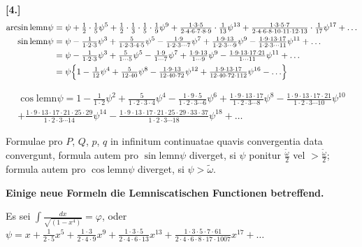 \documentclass[10pt,a4paper]{article}
\newcommand{\lemn}{\text{lemn}}
\newcommand{\sinlemn}{\sin\lemn}
\newcommand{\coslemn}{\cos\lemn}
\newcommand{\arcsinlemn}{\arcsin\lemn}
\begin{document}
\medskip
\noindent\textbf{[4.]}
\begin{align*}
\arcsinlemn\psi &= \psi + \tfrac12\cdot\tfrac15\psi^5 + \tfrac12\cdot\tfrac13\cdot\tfrac15\cdot\tfrac{1}{9}\psi^9 + \tfrac{1\cdot3\cdot5}{2\cdot4\cdot6\cdot7\cdot8\cdot9}\cdot\tfrac{1}{13}\psi^{13} + \tfrac{1\cdot3\cdot5\cdot7}{2\cdot4\cdot6\cdot8\cdot10\cdot11\cdot12\cdot13}\cdot\tfrac{1}{17}\psi^{17} + \ldots\\
\sinlemn\psi &= \psi - \tfrac{1}{1\cdot2\cdot3}\psi^3 + \tfrac{5}{1\cdot2\cdot3\cdot4\cdot5}\psi^5 - \tfrac{1\cdot9}{1\cdot2\cdot3\cdots7}\psi^7 + \tfrac{1\cdot9\cdot13}{1\cdot2\cdot3\cdots9}\psi^9 - \tfrac{1\cdot9\cdot13\cdot17}{1\cdot2\cdot3\cdots11}\psi^{11} + \ldots\\
&= \psi - \tfrac{1}{1\cdot2\cdot3}\psi^3 + \tfrac{5}{1\cdots5}\psi^5 - \tfrac{1\cdot9}{1\cdots7}\psi^7 + \tfrac{1\cdot9\cdot13}{1\cdots9}\psi^9 - \tfrac{1\cdot9\cdot13\cdot17\cdot21}{1\cdots11}\psi^{11} + \ldots\\
&= \psi\Bigl\{1 - \tfrac{1}{12}\psi^4 + \tfrac{5}{12\cdot40}\psi^8 - \tfrac{1\cdot9\cdot13}{12\cdot40\cdot72}\psi^{12} + \tfrac{1\cdot9\cdot13\cdot17}{12\cdot40\cdot72\cdot112}\psi^{16} - \ldots\Bigr\}
\end{align*}

\begin{multline*}
\coslemn\psi = 1 - \tfrac{1}{1\cdot2}\psi^2 + \tfrac{5}{1\cdot2\cdot3\cdot4}\psi^4 - \tfrac{1\cdot9\cdot5}{1\cdot2\cdot3\cdots6}\psi^6 + \tfrac{1\cdot9\cdot13\cdot17}{1\cdot2\cdot3\cdots8}\psi^8 - \tfrac{1\cdot9\cdot13\cdot17\cdot21}{1\cdot2\cdot3\cdots10}\psi^{10}\\
+ \tfrac{1\cdot9\cdot13\cdot17\cdot21\cdot25\cdot29}{1\cdot2\cdot3\cdots14}\psi^{14} - \tfrac{1\cdot9\cdot13\cdot17\cdot21\cdot25\cdot29\cdot33\cdot37}{1\cdot2\cdot3\cdots18}\psi^{18} + \ldots
\end{multline*}

Formulae pro $P$, $Q$, $p$, $q$ in infinitum continuatae quavis convergentia data convergunt, formula autem pro $\sinlemn\psi$ diverget, si $\psi$ ponitur $\frac{\tilde{\omega}}{2}$ vel $>\frac{\tilde{\omega}}{2}$; formula autem pro $\coslemn\psi$ diverget, si $\psi>\tilde{\omega}$.

\medskip
\noindent\textbf{Einige neue Formeln die Lemniscatischen Functionen betreffend.}

Es sei $\int\!\frac{dx}{\sqrt{(1-x^4)}}=\varphi$, oder $\psi = x + \tfrac{1}{2\cdot5}x^5 + \tfrac{1\cdot3}{2\cdot4\cdot9}x^9 + \tfrac{1\cdot3\cdot5}{2\cdot4\cdot6\cdot13}x^{13} + \tfrac{1\cdot3\cdot5\cdot7\cdot61}{2\cdot4\cdot6\cdot8\cdot17\cdot1007}x^{17} + \ldots$
\end{document}

